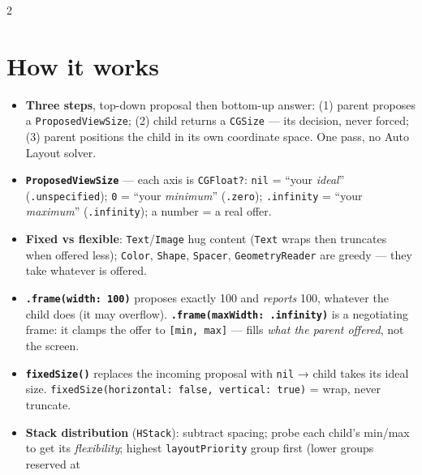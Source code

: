 \documentclass[8pt]{extarticle}
\begin{document}


\begin{multicols}{2}
\raggedright

\section{How it works}
\begin{itemize}
  \item \textbf{Three steps}, top-down proposal then bottom-up answer: (1) parent proposes a
        \texttt{ProposedViewSize}; (2) child returns a \texttt{CGSize} — its decision, never forced;
        (3) parent positions the child in its own coordinate space. One pass, no Auto Layout solver.
  \item \textbf{\texttt{ProposedViewSize}} — each axis is \texttt{CGFloat?}:
        \texttt{nil} = ``your \emph{ideal}'' (\texttt{.unspecified}); \texttt{0} = ``your \emph{minimum}''
        (\texttt{.zero}); \texttt{.infinity} = ``your \emph{maximum}'' (\texttt{.infinity}); a number = a real offer.
  \item \textbf{Fixed vs flexible}: \texttt{Text}/\texttt{Image} hug content (\texttt{Text} wraps then
        truncates when offered less); \texttt{Color}, \texttt{Shape}, \texttt{Spacer}, \texttt{GeometryReader}
        are greedy — they take whatever is offered.
  \item \textbf{\texttt{.frame(width: 100)}} proposes exactly 100 and \emph{reports} 100, whatever the child
        does (it may overflow). \textbf{\texttt{.frame(maxWidth: .infinity)}} is a negotiating frame: it clamps
        the offer to \texttt{[min, max]} — fills \emph{what the parent offered}, not the screen.
  \item \textbf{\texttt{fixedSize()}} replaces the incoming proposal with \texttt{nil} → child takes its ideal
        size. \texttt{fixedSize(horizontal: false, vertical: true)} = wrap, never truncate.
  \item \textbf{Stack distribution} (\texttt{HStack}): subtract spacing; probe each child's min/max to get
        its \emph{flexibility}; highest \texttt{layoutPriority} group first (lower groups reserved at

\end{itemize}
\end{multicols}
\end{document}
